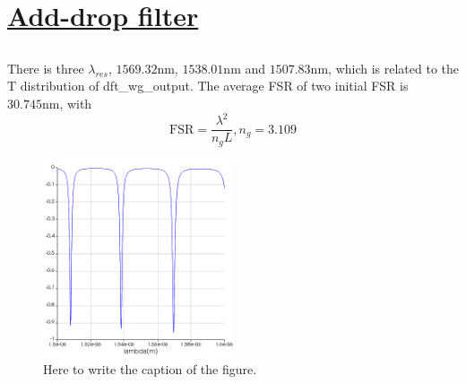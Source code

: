 \documentclass[fontsize=11pt]{scrartcl}
\begin{document}
\section{\uline{Add-drop filter}}
\subsection{}
There is three $\lambda_{res}$, $1569.32\mathrm{nm}$, $1538.01\mathrm{nm}$ and $1507.83\mathrm{nm}$, which is related to 
the T distribution of dft\_wg\_output. The average FSR of two initial FSR is $30.745\mathrm{nm}$, with 
\begin{equation} 
    \mathrm{FSR} =  \frac{\lambda ^{2} }{n_gL}, n_g=3.109
    \label{eq3}
\end{equation}
\begin{figure}[H]
    \centering
     \includegraphics[width=0.5\textwidth]{img/fig3.1.png}
     \caption{Here to write the caption of the figure.}
     \label{fig3.1}
\end{figure} 
\end{document}
